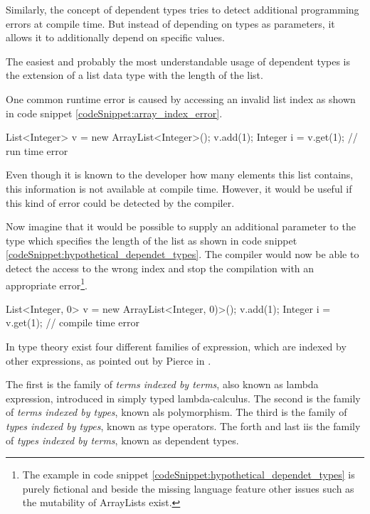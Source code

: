Similarly, the concept of dependent types tries to detect additional programming errors at compile time.
But instead of depending on types as parameters, it allows it to additionally depend on specific values. 

The easiest and probably the most understandable usage of dependent types is the extension of a list data type with the length of the list. 

One common runtime error is caused by accessing an invalid list index as shown in code snippet \ref{codeSnippet:array_index_error}.

\begin{codesnippet}[caption={ArrayList index error}, label={codeSnippet:array_index_error}]
List<Integer> v = new ArrayList<Integer>();
v.add(1);
Integer i = v.get(1); // run time error
\end{codesnippet}

Even though it is known to the developer how many elements this list contains, this information is not available at compile time. 
However, it would be useful if this kind of error could be detected by the compiler.

Now imagine that it would be possible to supply an additional parameter to the type which specifies the length of the list as shown in code snippet \ref{codeSnippet:hypothetical_dependet_types}. 
The compiler would now be able to detect the access to the wrong index and stop the compilation with an appropriate error\footnote{The example in code snippet \ref{codeSnippet:hypothetical_dependet_types} is purely fictional and beside the missing language feature other issues such as the mutability of ArrayLists exist.}.
\begin{adjustbox}{width=\columnwidth}
\begin{codesnippet}[escapeinside={(*}{*)}, caption={ArrayList with size parameter}, label={codeSnippet:hypothetical_dependet_types}]
List<Integer, 0> v = new ArrayList<Integer, 0)>();
v.add(1);
Integer i = v.get(1); // compile time error
\end{codesnippet}
\end{adjustbox}
\linebreak

In type theory exist four different families of expression, which are indexed by other expressions, as pointed out by Pierce in \cite{10.5555/1076265}. 

The first is the family of \emph{terms indexed by terms}, also known as lambda expression, introduced in simply typed lambda-calculus. 
The second is the family of \emph{terms indexed by types}, known als polymorphism. 
The third is the family of \emph{types indexed by types}, known as type operators.
The forth and last iis the family of \emph{types indexed by terms}, known as dependent types.

